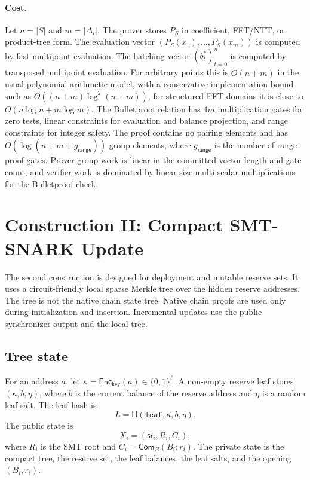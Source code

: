 \documentclass[runningheads]{llncs}
\newcommand{\bits}{\{0,1\}}
\newcommand{\Enc}{\mathsf{Enc}}
\newcommand{\Com}{\mathsf{Com}}
\newcommand{\CRH}{\mathsf{H}}
\newcommand{\sr}{\mathsf{sr}}
\newcommand{\softO}{\widetilde{O}}
\newcommand{\dlist}{\Delta}
\begin{document}
\paragraph{Cost.}
Let \(n=|S|\) and \(m=|\dlist_i|\).  The prover stores \(P_S\) in coefficient, FFT/NTT, or product-tree form.  The evaluation vector \((P_S(x_1),\ldots,P_S(x_m))\) is computed by fast multipoint evaluation.  The batching vector \((b_t^*)_{t=0}^n\) is computed by transposed multipoint evaluation.  For arbitrary points this is \(\softO(n+m)\) in the usual polynomial-arithmetic model, with a conservative implementation bound such as \(O((n+m)\log^2(n+m))\); for structured FFT domains it is close to \(O(n\log n+m\log m)\).  The Bulletproof relation has \(4m\) multiplication gates for zero tests, linear constraints for evaluation and balance projection, and range constraints for integer safety.  The proof contains no pairing elements and has \(O(\log(n+m+g_{\mathsf{range}}))\) group elements, where \(g_{\mathsf{range}}\) is the number of range-proof gates.  Prover group work is linear in the committed-vector length and gate count, and verifier work is dominated by linear-size multi-scalar multiplications for the Bulletproof check.

\section{Construction II: Compact SMT-SNARK Update}\label{sec:smt}

The second construction is designed for deployment and mutable reserve sets.  It uses a circuit-friendly local sparse Merkle tree over the hidden reserve addresses.  The tree is not the native chain state tree.  Native chain proofs are used only during initialization and insertion.  Incremental updates use the public synchronizer output and the local tree.

\subsection{Tree state}

For an address \(a\), let \(\kappa=\Enc_{\mathsf{key}}(a)\in\bits^\ell\).  A non-empty reserve leaf stores \((\kappa,b,\eta)\), where \(b\) is the current balance of the reserve address and \(\eta\) is a random leaf salt.  The leaf hash is
\[
        L=\CRH(\mathtt{leaf},\kappa,b,\eta).
\]
The public state is
\[
        X_i=(\sr_i,R_i,C_i),
\]
where \(R_i\) is the SMT root and \(C_i=\Com_B(B_i;r_i)\).  The private state is the compact tree, the reserve set, the leaf balances, the leaf salts, and the opening \((B_i,r_i)\).
\end{document}
